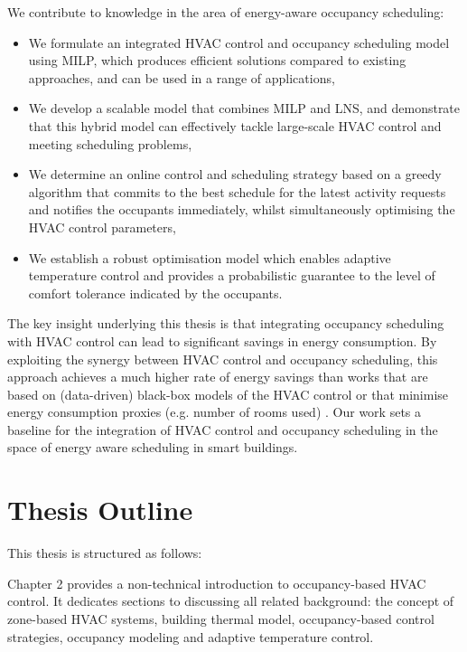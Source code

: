We contribute to knowledge in the area of energy-aware occupancy scheduling:
\begin{itemize}
	\item We formulate an integrated HVAC control and occupancy scheduling model using MILP, which produces efficient solutions compared to  existing approaches, and can be used in a range of applications,
	\item We develop a scalable model that combines MILP and LNS, and demonstrate that this hybrid model can effectively tackle large-scale HVAC control and meeting scheduling problems,
	\item We determine an online control and scheduling strategy based on a greedy algorithm that commits to the best schedule for the latest activity requests and notifies the occupants immediately, whilst simultaneously optimising the HVAC control parameters,
	\item We establish a robust optimisation model which enables adaptive temperature control and provides a probabilistic guarantee to the level of comfort tolerance indicated by the occupants.	
\end{itemize}

The key insight underlying this thesis is that integrating occupancy scheduling with HVAC control can lead to significant savings in energy consumption. By exploiting the synergy between HVAC control and occupancy scheduling, this approach achieves a much higher rate of energy savings than works that are based on (data-driven) black-box models of the HVAC control \citep{kwak2013tesla,chai2014minimizing} or that minimise energy consumption proxies (e.g. number of rooms used) \citep{majumdar2012energy,pan2012thermal}. Our work sets a baseline for the integration of HVAC control and occupancy scheduling in the space of energy aware scheduling in smart buildings.


\section{Thesis Outline}
\label{sec:outline}

This thesis is structured as follows:

Chapter 2 provides a non-technical introduction to occupancy-based HVAC control. It dedicates sections to discussing all related background: the concept of zone-based HVAC systems, building thermal model, occupancy-based control strategies, occupancy modeling and adaptive temperature control.

